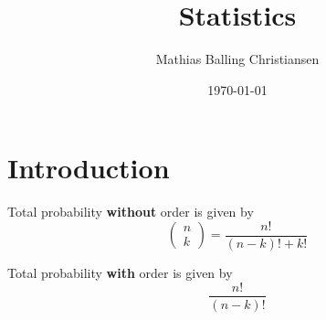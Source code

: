 \documentclass{article}
\title{Statistics}
\author{Mathias Balling Christiansen}
\date{\today}
\begin{document}
\maketitle
\tableofcontents
\newpage
\section{Introduction}
Total probability \textbf{without} order is given by
$$\begin{pmatrix}
  n\\
  k
\end{pmatrix}=\frac{n!}{(n-k)!+k!}$$

Total probability \textbf{with} order is given by
$$\frac{n!}{(n-k)!}$$
\end{document}
